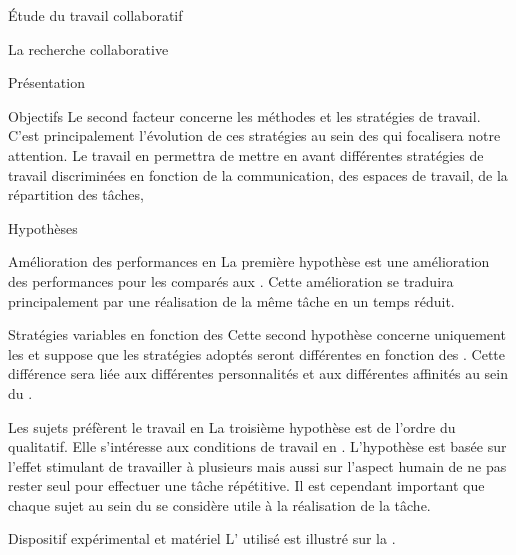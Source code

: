\documentclass[myfrancais]{mythesis}
\begin{document}
\begin{mypart}{Étude du travail collaboratif}
\begin{mychapter}{La recherche collaborative}
\begin{mysection}{Présentation}
\begin{mysubsection}{Objectifs}
					Le second facteur concerne les méthodes et les stratégies de travail.
					C'est principalement l'évolution de ces stratégies au sein des  qui focalisera notre attention.
					Le travail en  permettra de mettre en avant différentes stratégies de travail discriminées en fonction de la communication, des espaces de travail, de la répartition des tâches, \myetc
				\end{mysubsection}
				\begin{mysubsection}{Hypothèses}
					\begin{myparagraph}{ Amélioration des performances en }
						La première hypothèse est une amélioration des performances pour les  comparés aux .
						Cette amélioration se traduira principalement par une réalisation de la même tâche en un temps réduit.
					\end{myparagraph}
					\begin{myparagraph}{ Stratégies variables en fonction des }
						Cette second hypothèse concerne uniquement les  et suppose que les stratégies adoptés seront différentes en fonction des .
						Cette différence sera liée aux différentes personnalités et aux différentes affinités au sein du .
					\end{myparagraph}
					\begin{myparagraph}{ Les sujets préfèrent le travail en }
						La troisième hypothèse est de l'ordre du qualitatif.
						Elle s'intéresse aux conditions de travail en .
						L'hypothèse est basée  sur l'effet stimulant de travailler à plusieurs mais aussi sur l'aspect humain de ne pas rester seul pour effectuer une tâche répétitive.
						Il est cependant important que chaque sujet au sein du  se considère utile à la réalisation de la tâche.
					\end{myparagraph}
				\end{mysubsection}
			\end{mysection}
			\begin{mysection}{Dispositif expérimental et matériel}
				L' utilisé est illustré sur la .

\end{mysection}
\end{mychapter}
\end{mypart}
\end{document}
